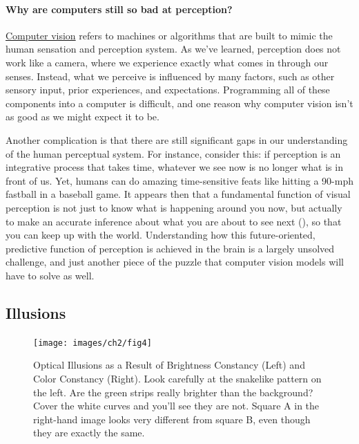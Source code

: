 \documentclass[
]{krantz}
\begin{document}
\paragraph*{Why are computers still so bad at perception?}\label{why-are-computers-still-so-bad-at-perception}

\hyperref[computer-vision]{Computer vision} refers to machines or algorithms that are built to mimic the human sensation and perception system. As we've learned, perception does not work like a camera, where we experience exactly what comes in through our senses. Instead, what we perceive is influenced by many factors, such as other sensory input, prior experiences, and expectations. Programming all of these components into a computer is difficult, and one reason why computer vision isn't as good as we might expect it to be.

Another complication is that there are still significant gaps in our understanding of the human perceptual system. For instance, consider this: if perception is an integrative process that takes time, whatever we see now is no longer what is in front of us. Yet, humans can do amazing time-sensitive feats like hitting a 90-mph fastball in a baseball game. It appears then that a fundamental function of visual perception is not just to know what is happening around you now, but actually to make an accurate inference about what you are about to see next (), so that you can keep up with the world. Understanding how this future-oriented, predictive function of perception is achieved in the brain is a largely unsolved challenge, and just another piece of the puzzle that computer vision models will have to solve as well.

\subsection*{Illusions}\label{illusions}


\begin{figure}

{\centering \texttt{[image: images/ch2/fig4]} 

}

\caption{Optical Illusions as a Result of Brightness Constancy (Left) and Color Constancy (Right). Look carefully at the snakelike pattern on the left. Are the green strips really brighter than the background? Cover the white curves and you’ll see they are not. Square A in the right-hand image looks very different from square B, even though they are exactly the same.}\label{fig:constancy}
\end{figure}
\end{document}
